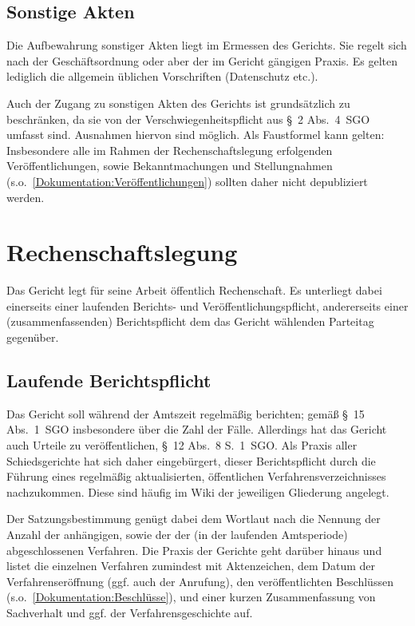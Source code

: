 \subsection{Sonstige Akten}
Die Aufbewahrung sonstiger Akten liegt im Ermessen des Gerichts.
Sie regelt sich nach der Geschäftsordnung oder aber der im Gericht gängigen Praxis.
Es gelten lediglich die allgemein üblichen Vorschriften (Datenschutz etc.).

Auch der Zugang zu sonstigen Akten des Gerichts ist grundsätzlich zu beschränken, da sie von der Verschwiegenheitspflicht aus \S~2 Abs.~4~SGO umfasst sind.
Ausnahmen hiervon sind möglich.
Als Faustformel kann gelten:
Insbesondere alle im Rahmen der Rechenschaftslegung erfolgenden Veröffentlichungen, sowie Bekanntmachungen und Stellungnahmen (s.o.~\ref{Dokumentation:Veröffentlichungen}) sollten daher nicht depubliziert werden.

\section{Rechenschaftslegung}
\label{Dokumentation:Rechenschaftslegung}
Das Gericht legt für seine Arbeit öffentlich Rechenschaft.
Es unterliegt dabei einerseits einer laufenden Berichts- und Veröffentlichungspflicht, andererseits einer (zusammenfassenden) Berichtspflicht dem das Gericht wählenden Parteitag gegenüber.

\subsection{Laufende Berichtspflicht}
\label{Dokumentation:Rechenschaftslegung:Laufend}
Das Gericht soll während der Amtszeit regelmäßig berichten; gemäß \S~15 Abs.~1~SGO insbesondere über die Zahl der Fälle.
Allerdings hat das Gericht auch Urteile zu veröffentlichen, \S~12 Abs.~8 S.~1~SGO.
Als Praxis aller Schiedsgerichte hat sich daher eingebürgert, dieser Berichtspflicht durch die Führung eines regelmäßig aktualisierten, öffentlichen Verfahrensverzeichnisses nachzukommen.
Diese sind häufig im Wiki der jeweiligen Gliederung angelegt.

Der Satzungsbestimmung genügt dabei dem Wortlaut nach die Nennung der Anzahl der anhängigen, sowie der der (in der laufenden Amtsperiode) abgeschlossenen Verfahren.
Die Praxis der Gerichte geht darüber hinaus und listet die einzelnen Verfahren zumindest mit Aktenzeichen, dem Datum der Verfahrenseröffnung (ggf. auch der Anrufung), den veröffentlichten Beschlüssen (s.o.~\ref{Dokumentation:Beschlüsse}), und einer kurzen Zusammenfassung von Sachverhalt und ggf. der Verfahrensgeschichte auf.

